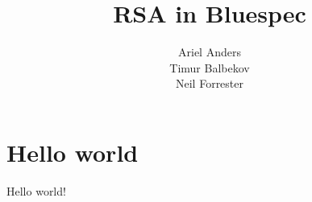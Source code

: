 \documentclass{article}
\title{RSA in Bluespec}
\author{Ariel Anders\\Timur Balbekov\\Neil Forrester}
\begin{document}
\maketitle

\tableofcontents

\section{Hello world}
Hello world!
\end{document}
